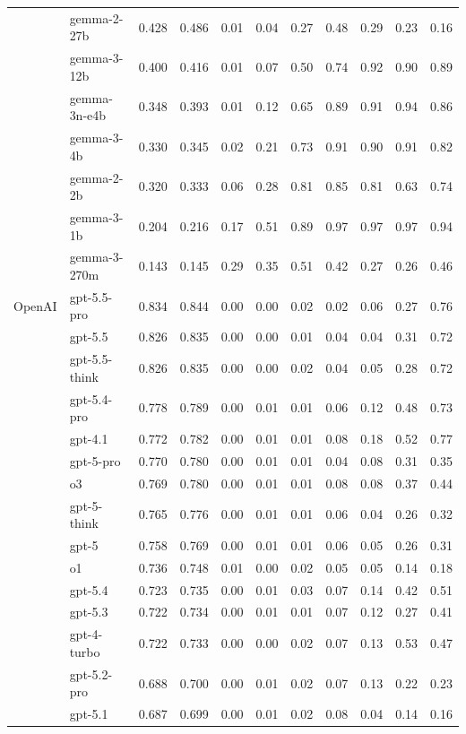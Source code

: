 \begin{longtable}{@{}ll rr rrrrrrr@{}}
 & gemma-2-27b & 0.428 & 0.486 & 0.01 & 0.04 & 0.27 & 0.48 & 0.29 & 0.23 & 0.16 \\
 & gemma-3-12b & 0.400 & 0.416 & 0.01 & 0.07 & 0.50 & 0.74 & 0.92 & 0.90 & 0.89 \\
 & gemma-3n-e4b & 0.348 & 0.393 & 0.01 & 0.12 & 0.65 & 0.89 & 0.91 & 0.94 & 0.86 \\
 & gemma-3-4b & 0.330 & 0.345 & 0.02 & 0.21 & 0.73 & 0.91 & 0.90 & 0.91 & 0.82 \\
 & gemma-2-2b & 0.320 & 0.333 & 0.06 & 0.28 & 0.81 & 0.85 & 0.81 & 0.63 & 0.74 \\
 & gemma-3-1b & 0.204 & 0.216 & 0.17 & 0.51 & 0.89 & 0.97 & 0.97 & 0.97 & 0.94 \\
 & gemma-3-270m & 0.143 & 0.145 & 0.29 & 0.35 & 0.51 & 0.42 & 0.27 & 0.26 & 0.46 \\
OpenAI & gpt-5.5-pro & 0.834 & 0.844 & 0.00 & 0.00 & 0.02 & 0.02 & 0.06 & 0.27 & 0.76 \\
 & gpt-5.5 & 0.826 & 0.835 & 0.00 & 0.00 & 0.01 & 0.04 & 0.04 & 0.31 & 0.72 \\
 & gpt-5.5-think & 0.826 & 0.835 & 0.00 & 0.00 & 0.02 & 0.04 & 0.05 & 0.28 & 0.72 \\
 & gpt-5.4-pro & 0.778 & 0.789 & 0.00 & 0.01 & 0.01 & 0.06 & 0.12 & 0.48 & 0.73 \\
 & gpt-4.1 & 0.772 & 0.782 & 0.00 & 0.01 & 0.01 & 0.08 & 0.18 & 0.52 & 0.77 \\
 & gpt-5-pro & 0.770 & 0.780 & 0.00 & 0.01 & 0.01 & 0.04 & 0.08 & 0.31 & 0.35 \\
 & o3 & 0.769 & 0.780 & 0.00 & 0.01 & 0.01 & 0.08 & 0.08 & 0.37 & 0.44 \\
 & gpt-5-think & 0.765 & 0.776 & 0.00 & 0.01 & 0.01 & 0.06 & 0.04 & 0.26 & 0.32 \\
 & gpt-5 & 0.758 & 0.769 & 0.00 & 0.01 & 0.01 & 0.06 & 0.05 & 0.26 & 0.31 \\
 & o1 & 0.736 & 0.748 & 0.01 & 0.00 & 0.02 & 0.05 & 0.05 & 0.14 & 0.18 \\
 & gpt-5.4 & 0.723 & 0.735 & 0.00 & 0.01 & 0.03 & 0.07 & 0.14 & 0.42 & 0.51 \\
 & gpt-5.3 & 0.722 & 0.734 & 0.00 & 0.01 & 0.01 & 0.07 & 0.12 & 0.27 & 0.41 \\
 & gpt-4-turbo & 0.722 & 0.733 & 0.00 & 0.00 & 0.02 & 0.07 & 0.13 & 0.53 & 0.47 \\
 & gpt-5.2-pro & 0.688 & 0.700 & 0.00 & 0.01 & 0.02 & 0.07 & 0.13 & 0.22 & 0.23 \\
 & gpt-5.1 & 0.687 & 0.699 & 0.00 & 0.01 & 0.02 & 0.08 & 0.04 & 0.14 & 0.16 \\

\end{longtable}
